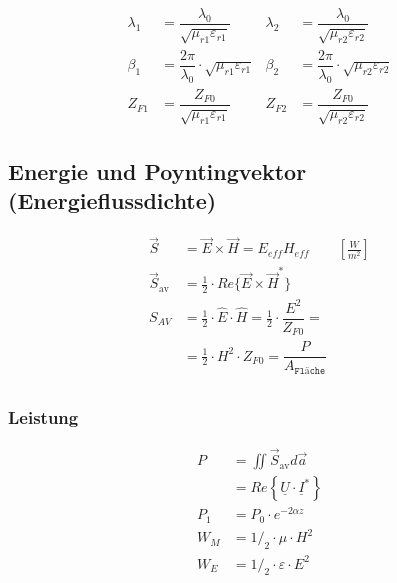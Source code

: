 % 
\begin{align*}
    \lambda_1 & = \dfrac{\lambda_0}{\sqrt{\mu_{r1}\varepsilon_{r1}}}          & \lambda_2 & = \dfrac{\lambda_0}{\sqrt{\mu_{r2}\varepsilon_{r2}}}                                     \\
    \beta_1   & = \dfrac{2\pi}{\lambda_0}\cdot\sqrt{\mu_{r1}\varepsilon_{r1}} & \beta_2   & = \dfrac{2\pi}{\lambda_0}\cdot\sqrt{\mu_{r2}\varepsilon_{r2}}                            \\
    Z_{F1}    & = \dfrac{Z_{F0}}{\sqrt{\mu_{r1}\varepsilon_{r1}}}             & Z_{F2}    & = \dfrac{Z_{F0}}{\sqrt{\mu_{r2}\varepsilon_{r2}}}
\end{align*}

\subsection{Energie und Poyntingvektor (Energieflussdichte)}
\begin{align*}
    \vec{S}             & =  \vec{E}\times\vec{H} = E_{eff} H_{eff} \qquad \si{\left[\frac{W}{m^2}\right]} \\
    \vec{S}_{\text{av}} & =  \frac{1}{2} \cdot Re\{\vec{E}\times\vec{H}^*\}              \\
    S_{AV}              & =  \frac{1}{2} \cdot \hat{E} \cdot \hat{H} = \frac{1}{2} \cdot \dfrac{E^2}{Z_{F0}} = \\
                        & =  \frac{1}{2} \cdot H^2 \cdot Z_{F0} =  \dfrac{P}{A_\texttt{Fläche}}                                \\
\end{align*}

\subsubsection{Leistung}

\begin{align*}
    P     & = \iint\vec{S}_{\text{av}}d\vec{a}                   \\
          & = Re\left\{\underline{U}\cdot\underline{I}^*\right\} \\
    P_1   & = P_0 \cdot e^{-2\alpha z}                           \\
    W_{M} & = 1/_2\cdot\mu\cdot H^2                              \\
    W_{E} & = 1/_2\cdot\varepsilon\cdot E^2
\end{align*}

